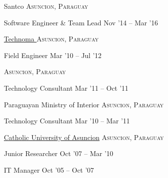 \documentclass[10pt,a4paper]{article} %
\begin{document}

\headedsection %
{Santco }
{\textsc{Asuncion, Paraguay}} {

\headedsubsection %
{Software Engineer \& Team Lead}
{Nov '14 -- Mar '16}
{}
}


\headedsection %
{\href{http://www.technoma.com.py/}{Technoma }}
{\textsc{Asuncion, Paraguay}} {

\headedsubsection %
{Field Engineer}
{Mar '10 -- Jul '12}
{}
}


\headedsection %
{\href{https://www.cba.com.py/}{ }}
{\textsc{Asuncion, Paraguay}} {

\headedsubsection %
{Technology Consultant}
{Mar '11 -- Oct '11}
{}
}


\headedsection %
{Paraguayan Ministry of Interior}
{\textsc{Asuncion, Paraguay}} {

\headedsubsection %
{Technology Consultant}
{Mar '10 -- Mar '11}
{}
}


\headedsection %
{\href{http://www.universidadcatolica.edu.py/}{Catholic University of Asuncion}}
{\textsc{Asuncion, Paraguay}} {

\headedsubsection %
{Junior Researcher}
{Oct '07 -- Mar '10}
{}

\headedsubsection %
{IT Manager}
{Oct '05 -- Oct '07}
{}
}

\end{document}
